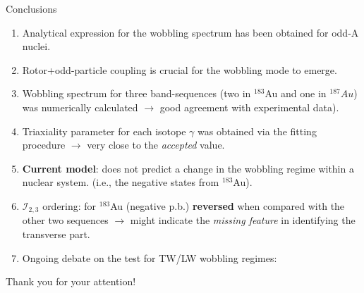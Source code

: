 \documentclass{beamer}
\begin{document}
\begin{frame}{Conclusions}
    \begin{enumerate}
        \item Analytical expression for the wobbling spectrum has been obtained for odd-A nuclei.
        \item Rotor+odd-particle coupling is crucial for the wobbling mode to emerge.
        \item Wobbling spectrum for three band-sequences (two in $^{183}$Au and one in $^{187}Au$) was numerically calculated $\to$ good agreement with experimental data).
        \item Triaxiality parameter for each isotope $\gamma$ was obtained via the fitting procedure $\to$ very close to the \emph{accepted} value.
        \item \textbf{Current model}: does not predict a change in the wobbling regime within a nuclear system. (i.e., the negative states from $^{183}$Au).
        \item $\mathcal{I}_{2,3}$ ordering: for $^{183}$Au (negative p.b.) \textbf{reversed} when compared with the other two sequences $\to$ {\color{red} might indicate the \emph{missing feature} in identifying the transverse part.}
        \item Ongoing debate on the test for TW/LW wobbling regimes: 
    \end{enumerate}
\end{frame}


  \begin{frame}
  \centering
    \Large{Thank you for your attention!}
  \end{frame}
\end{document}
